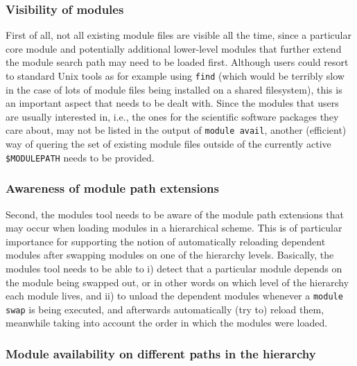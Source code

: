 \subsubsection{Visibility of modules}
\label{sec:hierarchical_consequences_visibility}

First of all, not all existing module files are visible all the time, since
a particular core module and potentially additional lower-level modules
that further extend the module search path may need to be loaded first.
Although users could resort to standard Unix tools as for example
using \texttt{\small find} (which would be terribly slow in the case of lots of
module files being installed on a shared filesystem), this
is an important aspect that needs to be dealt with. Since the modules that
users are usually interested in, i.e., the ones for the scientific software
packages they care about, may not be listed in the output of \texttt{\small module
avail}, another (efficient) way of quering the set of existing module files outside
of the currently active \texttt{\small \$MODULEPATH} needs to be
provided.

\subsubsection{Awareness of module path extensions}
\label{sec:hierarchical_consequences_extensions}

Second, the modules tool needs to be aware of the module path extensions that
may occur when loading modules in a hierarchical scheme. This is of
particular importance for supporting the notion of automatically reloading
dependent modules after swapping modules on one of the hierarchy levels.
Basically, the modules tool needs to be able to i) detect that a particular
module depends on the module being swapped out, or in other words on which
level of the hierarchy each module lives, and ii) to unload the dependent
modules whenever a \texttt{\small module swap} is being executed, and afterwards
automatically (try to) reload them, meanwhile taking into
account the order in which the modules were loaded.

\subsubsection{Module availability on different paths in the hierarchy}
\label{sec:hierarchical_consequences_availability}

